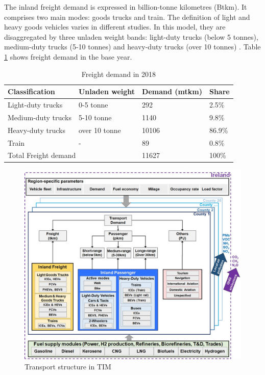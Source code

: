 \documentclass[gmd,manuscript]{copernicus}
\begin{document}
The inland freight demand is expressed in billion-tonne kilometres (Btkm). It comprises two main modes: goods trucks and train. The definition of light and heavy goods vehicles varies in different studies. In this model, they are disaggregated by three unladen weight bands: light-duty trucks (below 5 tonnes), medium-duty trucks (5-10 tonnes) and heavy-duty trucks (over 10 tonnes) \citep{CentralStatisticsOffice2020d,CentralStatisticsOffice2020e,CentralStatisticsOffice2020f}. Table \ref{ton-km} shows freight demand in the base year. 

\begin{table}[ht]
 \centering
 \footnotesize
 \caption{Freight demand in 2018 \citep{ CentralStatisticsOffice2020d, CentralStatisticsOffice2020e, CentralStatisticsOffice2020f}}
 \begin{tabular}{llll}
 \hline 
 Classification & Unladen weight & Demand (mtkm) & Share\\ 
 \hline
 Light-duty trucks & 0-5 tonne & 292 & 2.5\% \\
 Medium-duty trucks & 5-10 tonne & 1140 & 9.8\% \\
 Heavy-duty trucks & over 10 tonne &	10106 & 86.9\% \\
 Train & - &	89 & 0.8\% \\
 
 \multicolumn{2}{l}{Total Freight demand} & 11627 & 100\% \\ \hline
 \end{tabular}
 
 \label{ton-km}
\end{table}

\begin{figure}[ht]
 \centering
 \includegraphics[scale=0.60]{figures/Transport in TIM.jpg} 
 \caption{Transport structure in TIM}
 \label{fig:TRA-TIM}
\end{figure}
\end{document}
